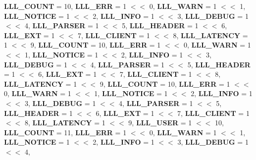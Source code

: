 \begin{DoxyCompactItemize}
\newline
{\bfseries L\+L\+L\+\_\+\+C\+O\+U\+NT} = 10, 
{\bfseries L\+L\+L\+\_\+\+E\+RR} = 1 $<$$<$ 0, 
{\bfseries L\+L\+L\+\_\+\+W\+A\+RN} = 1 $<$$<$ 1, 
{\bfseries L\+L\+L\+\_\+\+N\+O\+T\+I\+CE} = 1 $<$$<$ 2, 
\newline
{\bfseries L\+L\+L\+\_\+\+I\+N\+FO} = 1 $<$$<$ 3, 
{\bfseries L\+L\+L\+\_\+\+D\+E\+B\+UG} = 1 $<$$<$ 4, 
{\bfseries L\+L\+L\+\_\+\+P\+A\+R\+S\+ER} = 1 $<$$<$ 5, 
{\bfseries L\+L\+L\+\_\+\+H\+E\+A\+D\+ER} = 1 $<$$<$ 6, 
\newline
{\bfseries L\+L\+L\+\_\+\+E\+XT} = 1 $<$$<$ 7, 
{\bfseries L\+L\+L\+\_\+\+C\+L\+I\+E\+NT} = 1 $<$$<$ 8, 
{\bfseries L\+L\+L\+\_\+\+L\+A\+T\+E\+N\+CY} = 1 $<$$<$ 9, 
{\bfseries L\+L\+L\+\_\+\+C\+O\+U\+NT} = 10, 
\newline
{\bfseries L\+L\+L\+\_\+\+E\+RR} = 1 $<$$<$ 0, 
{\bfseries L\+L\+L\+\_\+\+W\+A\+RN} = 1 $<$$<$ 1, 
{\bfseries L\+L\+L\+\_\+\+N\+O\+T\+I\+CE} = 1 $<$$<$ 2, 
{\bfseries L\+L\+L\+\_\+\+I\+N\+FO} = 1 $<$$<$ 3, 
\newline
{\bfseries L\+L\+L\+\_\+\+D\+E\+B\+UG} = 1 $<$$<$ 4, 
{\bfseries L\+L\+L\+\_\+\+P\+A\+R\+S\+ER} = 1 $<$$<$ 5, 
{\bfseries L\+L\+L\+\_\+\+H\+E\+A\+D\+ER} = 1 $<$$<$ 6, 
{\bfseries L\+L\+L\+\_\+\+E\+XT} = 1 $<$$<$ 7, 
\newline
{\bfseries L\+L\+L\+\_\+\+C\+L\+I\+E\+NT} = 1 $<$$<$ 8, 
{\bfseries L\+L\+L\+\_\+\+L\+A\+T\+E\+N\+CY} = 1 $<$$<$ 9, 
{\bfseries L\+L\+L\+\_\+\+C\+O\+U\+NT} = 10, 
{\bfseries L\+L\+L\+\_\+\+E\+RR} = 1 $<$$<$ 0, 
\newline
{\bfseries L\+L\+L\+\_\+\+W\+A\+RN} = 1 $<$$<$ 1, 
{\bfseries L\+L\+L\+\_\+\+N\+O\+T\+I\+CE} = 1 $<$$<$ 2, 
{\bfseries L\+L\+L\+\_\+\+I\+N\+FO} = 1 $<$$<$ 3, 
{\bfseries L\+L\+L\+\_\+\+D\+E\+B\+UG} = 1 $<$$<$ 4, 
\newline
{\bfseries L\+L\+L\+\_\+\+P\+A\+R\+S\+ER} = 1 $<$$<$ 5, 
{\bfseries L\+L\+L\+\_\+\+H\+E\+A\+D\+ER} = 1 $<$$<$ 6, 
{\bfseries L\+L\+L\+\_\+\+E\+XT} = 1 $<$$<$ 7, 
{\bfseries L\+L\+L\+\_\+\+C\+L\+I\+E\+NT} = 1 $<$$<$ 8, 
\newline
{\bfseries L\+L\+L\+\_\+\+L\+A\+T\+E\+N\+CY} = 1 $<$$<$ 9, 
{\bfseries L\+L\+L\+\_\+\+U\+S\+ER} = 1 $<$$<$ 10, 
{\bfseries L\+L\+L\+\_\+\+C\+O\+U\+NT} = 11, 
{\bfseries L\+L\+L\+\_\+\+E\+RR} = 1 $<$$<$ 0, 
\newline
{\bfseries L\+L\+L\+\_\+\+W\+A\+RN} = 1 $<$$<$ 1, 
{\bfseries L\+L\+L\+\_\+\+N\+O\+T\+I\+CE} = 1 $<$$<$ 2, 
{\bfseries L\+L\+L\+\_\+\+I\+N\+FO} = 1 $<$$<$ 3, 
{\bfseries L\+L\+L\+\_\+\+D\+E\+B\+UG} = 1 $<$$<$ 4, 

\end{DoxyCompactItemize}
